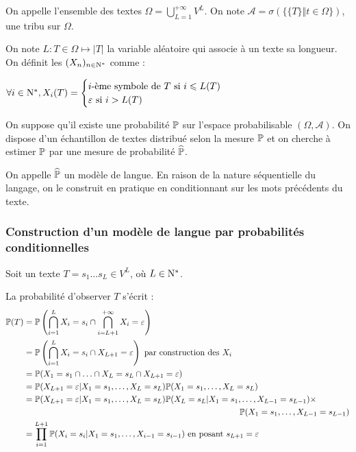 \begin{definition}
On appelle l'ensemble des textes $\Omega = \bigcup_{L=1}^{+\infty} V^L$.
On note $\mathcal{A} = \sigma\left(\{\{T\} \Vert t \in \Omega \} \right)$, une tribu sur $\Omega$.
\end{definition}

On note $L : T \in \Omega \mapsto \vert T \vert$ la variable aléatoire qui associe à un texte sa longueur.
On définit les $(X_n)_{n \in \N^*}$ comme :

$\forall i \in \N^*, X_i(T) = \begin{cases}
  i\text{-ème symbole de } T \text{ si } i \leq L(T) \\
  \varepsilon \text{ si } i > L(T) 
\end{cases}$

\vspace{0.4cm}

On suppose qu'il existe une probabilité $\P$ sur l'espace probabilisable $(\Omega, \mathcal{A})$.
On dispose d'un échantillon de textes distribué selon la mesure $\P$ et on cherche à estimer $\P$ par une mesure de probabilité $\widehat{\P}$.

On appelle $\widehat{\P}$ un modèle de langue. En raison de la nature séquentielle du langage, on le construit en pratique en conditionnant sur les mots précédents du texte.


\subsubsection{Construction d'un modèle de langue par probabilités conditionnelles}
Soit un texte $T=s_1\ldots s_L \in V^L$, où $L \in\N^*$. 

La probabilité d'observer $T$ s'écrit :
\begin{align*}
  \P(T) &= \P\left(\bigcap_{i=1}^L X_i=s_i \cap \bigcap_{i=L+1}^{+\infty} X_i = \varepsilon\right) \\
  &= \P\left(\bigcap_{i=1}^L X_i=s_i \cap X_{L+1} = \varepsilon  \right) \text{ par construction des } X_i\\
  &= \P(X_1 = s_1 \cap \ldots \cap X_L = s_L \cap X_{L+1} = \varepsilon) \\
  &= \P(X_{L+1}=\varepsilon \vert X_1=s_1,\ldots, X_L=s_L)\P(X_1=s_1,\ldots, X_L=s_L) \\
  &= \P(X_{L+1}=\varepsilon \vert X_1=s_1,\ldots, X_L=s_L)\P(X_L=s_L\vert X_1=s_1,\ldots, X_{L-1}=s_{L-1}) \times \\
  & \hspace{9cm}\P(X_1=s_1 ,\ldots, X_{L-1}=s_{L-1}) \\ 
  &=\prod_{i=1}^{L+1} \P(X_i=s_i \vert X_1=s_1,\ldots, X_{i-1}=s_{i-1}) \text{ en posant } s_{L+1} = \varepsilon
\end{align*}


